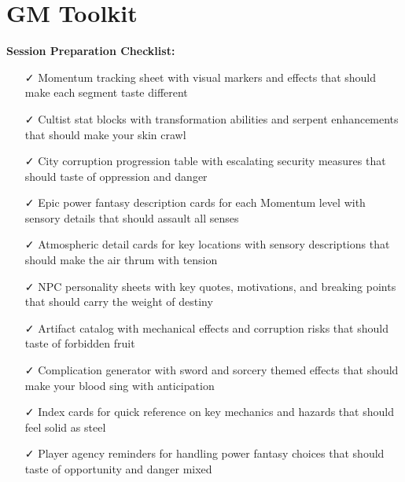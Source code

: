 \documentclass[11pt]{article}
\begin{document}
\section{GM Toolkit}

\textbf{Session Preparation Checklist:}
\begin{itemize}
\item [✓] Momentum tracking sheet with visual markers and effects that should make each segment taste different
\item [✓] Cultist stat blocks with transformation abilities and serpent enhancements that should make your skin crawl
\item [✓] City corruption progression table with escalating security measures that should taste of oppression and danger
\item [✓] Epic power fantasy description cards for each Momentum level with sensory details that should assault all senses
\item [✓] Atmospheric detail cards for key locations with sensory descriptions that should make the air thrum with tension
\item [✓] NPC personality sheets with key quotes, motivations, and breaking points that should carry the weight of destiny
\item [✓] Artifact catalog with mechanical effects and corruption risks that should taste of forbidden fruit
\item [✓] Complication generator with sword and sorcery themed effects that should make your blood sing with anticipation
\item [✓] Index cards for quick reference on key mechanics and hazards that should feel solid as steel
\item [✓] Player agency reminders for handling power fantasy choices that should taste of opportunity and danger mixed
\end{itemize}
\end{document}
